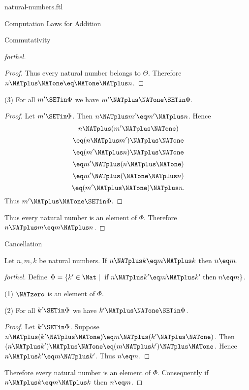 \documentclass{stex}
\begin{document}
\begin{smodule}{natural-numbers.ftl}
\begin{sfragment}{Computation Laws for Addition}
\begin{sfragment}{Commutativity}
\begin{proof}[forthel]
\begin{proof}
        Thus every natural number belongs to $\Theta$.
        Therefore $n \NATplus \NATone \eq \NATone \NATplus n$.
      \end{proof}

      (3) For all $m' \SETin \Phi$ we have $m' \NATplus \NATone \SETin \Phi$.
      \begin{proof}
        Let $m' \SETin \Phi$.
        Then $n \NATplus m' \eq m' \NATplus n$.
        Hence
        \[  n \NATplus (m'  \NATplus \NATone)       \]
        \[    \eq (n \NATplus m') \NATplus \NATone    \]
        \[    \eq (m' \NATplus n) \NATplus \NATone    \]
        \[    \eq m' \NATplus (n \NATplus \NATone)    \]
        \[    \eq m' \NATplus (\NATone \NATplus n)    \]
        \[    \eq (m' \NATplus \NATone) \NATplus n.   \]
        Thus $m' \NATplus \NATone \SETin \Phi$.
      \end{proof}

      Thus every natural number is an element of $\Phi$.
      Therefore $n \NATplus m \eq m \NATplus n$.
    \end{proof}
  \end{sfragment}

  \begin{sfragment}{Cancellation}
    \begin{proposition}[forthel,id=ARITHMETIC_03_3137702874578944]
      Let $n, m, k$ be natural numbers.
      If $n \NATplus k \eq m \NATplus k$ then $n \eq m$.
    \end{proposition}
    \begin{proof}[forthel]
      Define $\Phi = \{ k' \in \Nat \mid\text{ if }n \NATplus k' \eq m \NATplus k'\text{ then }n \eq m \}$.

      (1) $\NATzero$ is an element of $\Phi$.

      (2) For all $k' \SETin \Phi$ we have $k' \NATplus \NATone \SETin \Phi$.
      \begin{proof}
        Let $k' \SETin \Phi$.
        Suppose $n \NATplus (k' \NATplus \NATone) \eq m \NATplus (k' \NATplus \NATone)$.
        Then $(n \NATplus k') \NATplus \NATone \eq (m \NATplus k') \NATplus \NATone$.
        Hence $n \NATplus k' \eq m \NATplus k'$.
        Thus $n \eq m$.
      \end{proof}

      Therefore every natural number is an element of $\Phi$.
      Consequently if $n \NATplus k \eq m \NATplus k$ then $n \eq m$.
    \end{proof}


\end{sfragment}
\end{sfragment}
\end{smodule}
\end{document}
